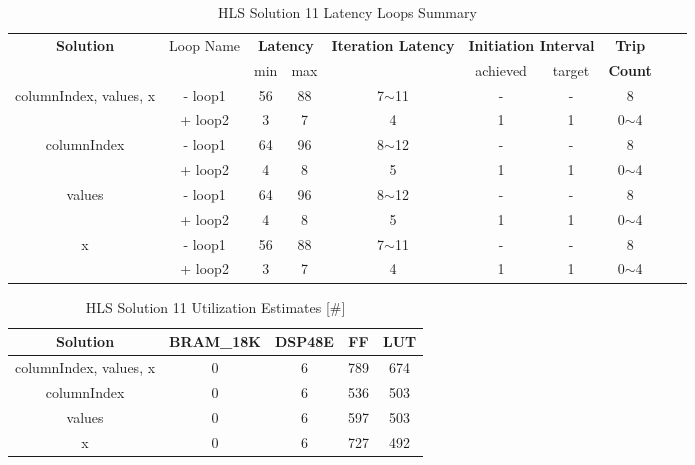 \begin{table}[H]
	\centering
	\begin{tabular}{|c|c|c|c|c|c|c|c|c|c|}
		\hline
		\multicolumn{1}{|c|}{\textbf{Solution}} & \multicolumn{1}{|c|}{Loop Name} & \multicolumn{2}{|c|}{\textbf{Latency}} & \multicolumn{1}{c|}{\textbf{Iteration Latency}} & \multicolumn{2}{c|}{\textbf{Initiation Interval}} & \multicolumn{1}{c|}{\textbf{Trip}}  \\
		&  & min & max & & achieved & target & \textbf{Count} \\
		\hline
		columnIndex, values, x & - loop1 & 56 & 88 & 7$\sim$11 & - & - & 8 \\
		& + loop2 & 3 & 7 & 4 & 1 & 1 & 0$\sim$4 \\
		\hline
		columnIndex & - loop1 & 64 & 96 & 8$\sim$12 & - & - & 8 \\
		& + loop2 & 4 & 8 & 5 & 1 & 1 & 0$\sim$4 \\
		\hline
		values & - loop1 & 64 & 96 & 8$\sim$12 & - & - & 8 \\
		& + loop2 & 4 & 8 & 5 & 1 & 1 & 0$\sim$4 \\
		\hline
		x & - loop1 & 56 & 88 & 7$\sim$11 & - & - & 8 \\
		& + loop2 & 3 & 7 & 4 & 1 & 1 & 0$\sim$4 \\
		\hline
	\end{tabular}
	\caption{HLS Solution 11 Latency Loops Summary }
	\label{tab:hls-solution-11-loop-summary}
\end{table}

\begin{table}[H]
	\centering
	\begin{tabular}{|c|c|c|c|c|}
		\hline
		\textbf{Solution} & \textbf{BRAM\_18K} & \textbf{DSP48E} & \textbf{FF} & \textbf{LUT} \\
		\hline
		columnIndex, values, x & 0 & 6 & 789 & 674 \\
		\hline
		columnIndex & 0 & 6 & 536 & 503 \\
		\hline
		values & 0 & 6 & 597 & 503 \\
		\hline
		x & 0 & 6 & 727 & 492 \\
		\hline
	\end{tabular}
	\caption{HLS Solution 11 Utilization Estimates [\#]}
	\label{tab:hls-solution-11-utilization-report}
\end{table}

